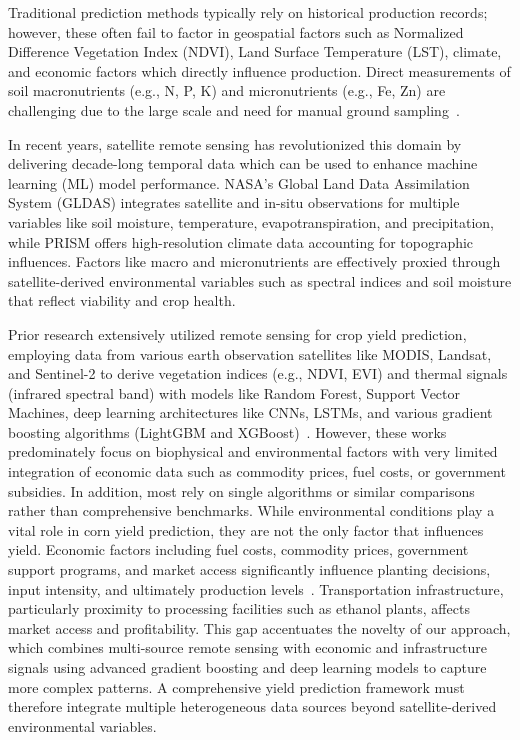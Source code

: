 \documentclass[10pt,twocolumn]{article}
\begin{document}
Traditional prediction methods typically rely on historical production records; however, these often fail to factor in geospatial factors such as Normalized Difference Vegetation Index (NDVI), Land Surface Temperature (LST), climate, and economic factors which directly influence production.
Direct measurements of soil macronutrients (e.g., N, P, K) and micronutrients (e.g., Fe, Zn) are challenging due to the large scale and need for manual ground sampling~\cite{kayad2019sentinel2, ji2022corn}.

In recent years, satellite remote sensing has revolutionized this domain by delivering decade-long temporal data which can be used to enhance machine learning (ML) model performance.
NASA's Global Land Data Assimilation System (GLDAS) integrates satellite and in-situ observations for multiple variables like soil moisture, temperature, evapotranspiration, and precipitation, while PRISM offers high-resolution climate data accounting for topographic influences.
Factors like macro and micronutrients are effectively proxied through satellite-derived environmental variables such as spectral indices and soil moisture that reflect viability and crop health.

Prior research extensively utilized remote sensing for crop yield prediction, employing data from various earth observation satellites like MODIS, Landsat, and Sentinel-2 to derive vegetation indices (e.g., NDVI, EVI) and thermal signals (infrared spectral band) with models like Random Forest, Support Vector Machines, deep learning architectures like CNNs, LSTMs, and various gradient boosting algorithms (LightGBM and XGBoost)~\cite{kayad2019sentinel2, nevavuori2020crop, prasetyo2024random, roy2025sentinel1, singh2025cloud, esa, chen2016xgboost, ke2017lightgbm}.
However, these works predominately focus on biophysical and environmental factors with very limited integration of economic data such as commodity prices, fuel costs, or government subsidies.
In addition, most rely on single algorithms or similar comparisons rather than comprehensive benchmarks.
While environmental conditions play a vital role in corn yield prediction, they are not the only factor that influences yield.
Economic factors including fuel costs, commodity prices, government support programs, and market access significantly influence planting decisions, input intensity, and ultimately production levels~\cite{usda_ers}.
Transportation infrastructure, particularly proximity to processing facilities such as ethanol plants, affects market access and profitability.
This gap accentuates the novelty of our approach, which combines multi-source remote sensing with economic and infrastructure signals using advanced gradient boosting and deep learning models to capture more complex patterns.
A comprehensive yield prediction framework must therefore integrate multiple heterogeneous data sources beyond satellite-derived environmental variables.
\end{document}
